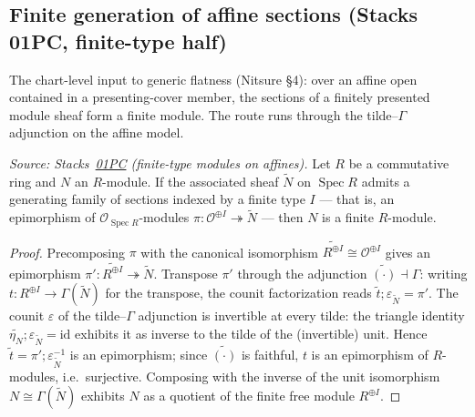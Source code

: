 \subsection{Finite generation of affine sections (Stacks 01PC, finite-type half)}

The chart-level input to generic flatness (Nitsure \S4): over an affine open
contained in a presenting-cover member, the sections of a finitely presented
module sheaf form a finite module. The route runs through the tilde--$\Gamma$
adjunction on the affine model.

\begin{lemma}
  \leanok
  \label{lem:module_finite_of_tilde_genSections}
  \textit{Source: Stacks~\href{https://stacks.math.columbia.edu/tag/01PC}{01PC}
  (finite-type modules on affines).}
  Let \(R\) be a commutative ring and \(N\) an \(R\)-module. If the associated
  sheaf \(\widetilde N\) on \(\operatorname{Spec} R\) admits a generating
  family of sections indexed by a finite type \(I\) — that is, an epimorphism
  of \(\mathcal O_{\operatorname{Spec} R}\)-modules
  \(\pi : \mathcal O^{\oplus I} \twoheadrightarrow \widetilde N\) — then \(N\)
  is a finite \(R\)-module.
\end{lemma}
\begin{proof}
  \leanok
  Precomposing \(\pi\) with the canonical isomorphism
  \(\widetilde{R^{\oplus I}} \cong \mathcal O^{\oplus I}\) gives an epimorphism
  \(\pi' : \widetilde{R^{\oplus I}} \twoheadrightarrow \widetilde N\).
  Transpose \(\pi'\) through the adjunction
  \(\widetilde{(\cdot)} \dashv \Gamma\): writing
  \(t : R^{\oplus I} \to \Gamma(\widetilde N)\) for the transpose,
  the counit factorization reads
  \(\widetilde{t} \mathbin{;} \varepsilon_{\widetilde N} = \pi'\).
  The counit \(\varepsilon\) of the tilde--\(\Gamma\) adjunction is invertible
  at every tilde: the triangle identity
  \(\widetilde{\eta_N} \mathbin{;} \varepsilon_{\widetilde N} = \mathrm{id}\)
  exhibits it as inverse to the tilde of the (invertible) unit. Hence
  \(\widetilde t = \pi' \mathbin{;} \varepsilon_{\widetilde N}^{-1}\) is an
  epimorphism; since \(\widetilde{(\cdot)}\) is faithful, \(t\) is an
  epimorphism of \(R\)-modules, i.e.\ surjective. Composing with the inverse
  of the unit isomorphism \(N \cong \Gamma(\widetilde N)\) exhibits \(N\) as a
  quotient of the finite free module \(R^{\oplus I}\).
\end{proof}

